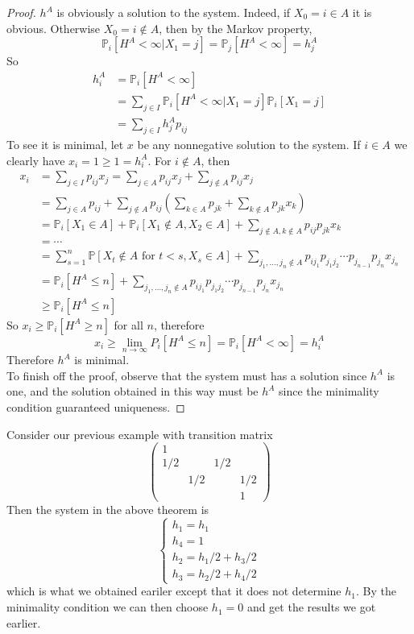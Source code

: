 \begin{proof}
    $h^A$ is obviously a solution to the system.
    Indeed, if $X_0=i\in A$ it is obvious.
    Otherwise $X_0=i\notin A$, then by the Markov property,
    $$\mathbb P_i[H^A<\infty|X_1=j]=\mathbb P_j[H^A<\infty]=h_j^A$$
    So
    \begin{align*}
        h_i^A&=\mathbb P_i[H^A<\infty]\\
        &=\sum_{j\in I}\mathbb P_i[H^A<\infty|X_1=j]\mathbb P_i[X_1=j]\\
        &=\sum_{j\in I}h_j^Ap_{ij}
    \end{align*}
    To see it is minimal, let $x$ be any nonnegative solution to the system.
    If $i\in A$ we clearly have $x_i=1\ge 1=h_i^A$.
    For $i\notin A$, then
    \begin{align*}
        x_i&=\sum_{j\in I}p_{ij}x_j=\sum_{j\in A}p_{ij}x_j+\sum_{j\notin A}p_{ij}x_j\\
        &=\sum_{j\in A}p_{ij}+\sum_{j\notin A}p_{ij}\left( \sum_{k\in A}p_{jk}+\sum_{k\notin A}p_{jk}x_k \right)\\
        &=\mathbb P_i[X_1\in A]+\mathbb P_i[X_1\notin A,X_2\in A]+\sum_{j\notin A,k\notin A}p_{ij}p_{jk}x_k\\
        &=\cdots\\
        &=\sum_{s=1}^n\mathbb P[X_t\notin A\text{ for $t<s$},X_s\in A]+\sum_{j_1,\ldots,j_n\notin A}p_{ij_1}p_{j_1j_2}\cdots p_{j_{n-1}}p_{j_n}x_{j_n}\\
        &=\mathbb P_i[H^A\le n]+\sum_{j_1,\ldots,j_n\notin A}p_{ij_1}p_{j_1j_2}\cdots p_{j_{n-1}}p_{j_n}x_{j_n}\\
        &\ge\mathbb P_i[H^A\le n]
    \end{align*}
    So $x_i\ge \mathbb P_i[H^A\ge n]$ for all $n$, therefore
    $$x_i\ge\lim_{n\to\infty}P_i[H^A\le n]=\mathbb P_i[H^A<\infty]=h_i^A$$
    Therefore $h^A$ is minimal.\\
    To finish off the proof, observe that the system must has a solution since $h^A$ is one, and the solution obtained in this way must be $h^A$ since the minimality condition guaranteed uniqueness.
\end{proof}
\begin{example}
    Consider our previous example with transition matrix
    $$\begin{pmatrix}
        1&&&\\
        1/2&&1/2&\\
        &1/2&&1/2\\
        &&&1
    \end{pmatrix}$$
    Then the system in the above theorem is
    $$\begin{cases}
        h_1=h_1\\
        h_4=1\\
        h_2=h_1/2+h_3/2\\
        h_3=h_2/2+h_4/2
    \end{cases}$$
    which is what we obtained eariler except that it does not determine $h_1$.
    By the minimality condition we can then choose $h_1=0$ and get the results we got earlier.
\end{example}
